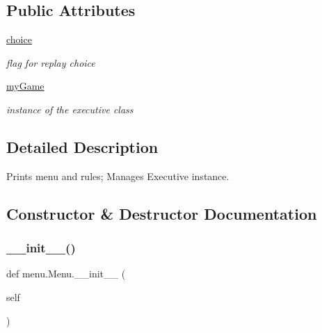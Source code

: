 \subsection*{Public Attributes}
\begin{DoxyCompactItemize}
\item 
\mbox{\label{classmenu_1_1_menu_a6cf806a058c7fdc8e9c36e2d4d4843d9}} 
\mbox{\hyperlink{classmenu_1_1_menu_a6cf806a058c7fdc8e9c36e2d4d4843d9}{choice}}
\begin{DoxyCompactList}\small\item\em flag for replay choice \end{DoxyCompactList}\item 
\mbox{\label{classmenu_1_1_menu_a779db2c87e458ec852957fdc0031f1cb}} 
\mbox{\hyperlink{classmenu_1_1_menu_a779db2c87e458ec852957fdc0031f1cb}{my\+Game}}
\begin{DoxyCompactList}\small\item\em instance of the executive class \end{DoxyCompactList}\end{DoxyCompactItemize}


\subsection{Detailed Description}
Prints menu and rules; Manages Executive instance. 

\subsection{Constructor \& Destructor Documentation}
\mbox{\label{classmenu_1_1_menu_a8cfc3229464bca830019a5ca722f9649}} 
\subsubsection{\texorpdfstring{\+\_\+\+\_\+init\+\_\+\+\_\+()}{\_\_init\_\_()}}
{\footnotesize\ttfamily def menu.\+Menu.\+\_\+\+\_\+init\+\_\+\+\_\+ (\begin{DoxyParamCaption}\item[{}]{self }\end{DoxyParamCaption})}



